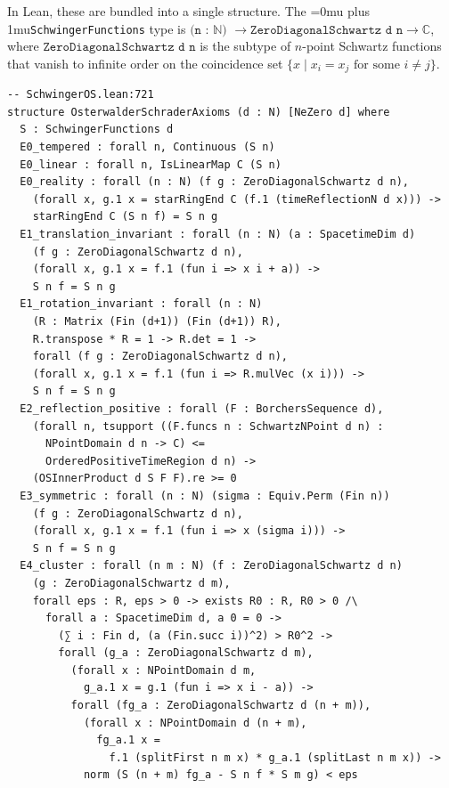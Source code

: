\documentclass[11pt,a4paper]{article}
\newcommand{\leanname}[1]{\begingroup\Urlmuskip=0mu plus 1mu\relax\nolinkurl{#1}\endgroup}
\begin{document}
\medskip
In Lean, these are bundled into a single structure. The \leanname{SchwingerFunctions}
type is $\texttt{(n : } \mathbb{N}\texttt{) } \to \texttt{ZeroDiagonalSchwartz d n} \to \mathbb{C}$,
where $\texttt{ZeroDiagonalSchwartz d n}$ is the subtype of $n$-point Schwartz functions
that vanish to infinite order on the coincidence set $\{x \mid x_i = x_j \text{ for some } i \neq j\}$.

\begin{lstlisting}
-- SchwingerOS.lean:721
structure OsterwalderSchraderAxioms (d : N) [NeZero d] where
  S : SchwingerFunctions d
  E0_tempered : forall n, Continuous (S n)
  E0_linear : forall n, IsLinearMap C (S n)
  E0_reality : forall (n : N) (f g : ZeroDiagonalSchwartz d n),
    (forall x, g.1 x = starRingEnd C (f.1 (timeReflectionN d x))) ->
    starRingEnd C (S n f) = S n g
  E1_translation_invariant : forall (n : N) (a : SpacetimeDim d)
    (f g : ZeroDiagonalSchwartz d n),
    (forall x, g.1 x = f.1 (fun i => x i + a)) ->
    S n f = S n g
  E1_rotation_invariant : forall (n : N)
    (R : Matrix (Fin (d+1)) (Fin (d+1)) R),
    R.transpose * R = 1 -> R.det = 1 ->
    forall (f g : ZeroDiagonalSchwartz d n),
    (forall x, g.1 x = f.1 (fun i => R.mulVec (x i))) ->
    S n f = S n g
  E2_reflection_positive : forall (F : BorchersSequence d),
    (forall n, tsupport ((F.funcs n : SchwartzNPoint d n) :
      NPointDomain d n -> C) <=
      OrderedPositiveTimeRegion d n) ->
    (OSInnerProduct d S F F).re >= 0
  E3_symmetric : forall (n : N) (sigma : Equiv.Perm (Fin n))
    (f g : ZeroDiagonalSchwartz d n),
    (forall x, g.1 x = f.1 (fun i => x (sigma i))) ->
    S n f = S n g
  E4_cluster : forall (n m : N) (f : ZeroDiagonalSchwartz d n)
    (g : ZeroDiagonalSchwartz d m),
    forall eps : R, eps > 0 -> exists R0 : R, R0 > 0 /\
      forall a : SpacetimeDim d, a 0 = 0 ->
        (∑ i : Fin d, (a (Fin.succ i))^2) > R0^2 ->
        forall (g_a : ZeroDiagonalSchwartz d m),
          (forall x : NPointDomain d m,
            g_a.1 x = g.1 (fun i => x i - a)) ->
          forall (fg_a : ZeroDiagonalSchwartz d (n + m)),
            (forall x : NPointDomain d (n + m),
              fg_a.1 x =
                f.1 (splitFirst n m x) * g_a.1 (splitLast n m x)) ->
            norm (S (n + m) fg_a - S n f * S m g) < eps
\end{lstlisting}
\end{document}
